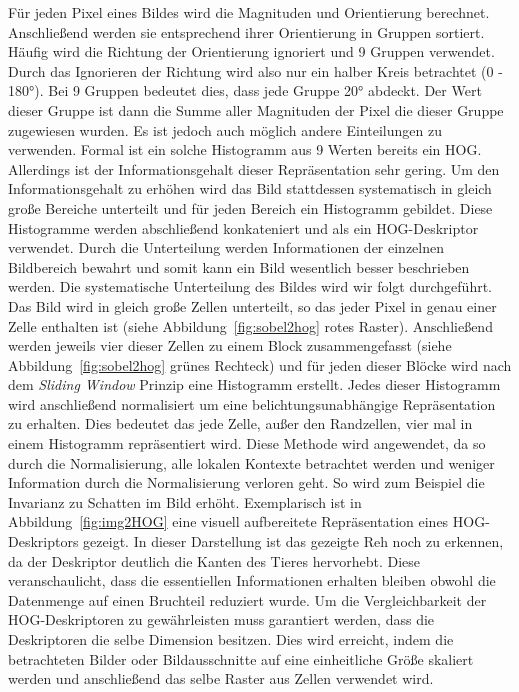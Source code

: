 Für jeden Pixel eines Bildes wird die Magnituden und Orientierung berechnet. Anschließend werden sie entsprechend ihrer Orientierung in Gruppen sortiert. Häufig wird die Richtung der Orientierung ignoriert und 9 Gruppen verwendet. Durch das Ignorieren der Richtung wird also nur ein halber Kreis betrachtet (0 - 180°). Bei 9 Gruppen bedeutet dies, dass jede Gruppe 20° abdeckt. Der Wert dieser Gruppe ist dann die Summe aller Magnituden der Pixel die dieser Gruppe zugewiesen wurden. Es ist jedoch auch möglich andere Einteilungen zu verwenden. 
Formal ist ein solche Histogramm aus 9 Werten bereits ein HOG. Allerdings ist der Informationsgehalt dieser Repräsentation sehr gering. Um den Informationsgehalt zu erhöhen wird das Bild stattdessen systematisch in gleich große Bereiche unterteilt und für jeden Bereich ein Histogramm gebildet. Diese Histogramme werden abschließend konkateniert und als ein HOG-Deskriptor verwendet. Durch die Unterteilung werden Informationen der einzelnen Bildbereich bewahrt und somit kann ein Bild wesentlich besser beschrieben werden. Die systematische Unterteilung des Bildes wird wir folgt durchgeführt. Das Bild wird in gleich große Zellen unterteilt, so das jeder Pixel in genau einer Zelle enthalten ist (siehe Abbildung~\ref{fig:sobel2hog} rotes Raster). Anschließend werden jeweils vier dieser Zellen zu einem Block zusammengefasst (siehe Abbildung~\ref{fig:sobel2hog} grünes Rechteck) und für jeden dieser Blöcke wird nach dem \textit{Sliding Window} Prinzip eine Histogramm erstellt. Jedes dieser Histogramm wird anschließend normalisiert um eine belichtungsunabhängige Repräsentation zu erhalten. Dies bedeutet das jede Zelle, außer den Randzellen, vier mal in einem Histogramm repräsentiert wird. Diese Methode wird angewendet, da so durch die Normalisierung, alle lokalen Kontexte betrachtet werden und weniger Information durch die Normalisierung verloren geht. So wird zum Beispiel die Invarianz zu Schatten im Bild erhöht. 
Exemplarisch ist in Abbildung~\ref{fig:img2HOG} eine visuell aufbereitete Repräsentation eines HOG-Deskriptors gezeigt. In dieser Darstellung ist das gezeigte Reh noch zu erkennen, da der Deskriptor deutlich die Kanten des Tieres hervorhebt. Diese veranschaulicht, dass die essentiellen Informationen erhalten bleiben obwohl die Datenmenge auf einen Bruchteil reduziert wurde. Um die Vergleichbarkeit der HOG-Deskriptoren zu gewährleisten muss garantiert werden, dass die Deskriptoren die selbe Dimension besitzen. Dies wird erreicht, indem die betrachteten Bilder oder Bildausschnitte auf eine einheitliche Größe skaliert werden und anschließend das selbe Raster aus Zellen verwendet wird.  \cite{dalal05}\cite{HOG1}
